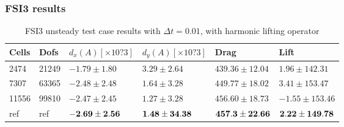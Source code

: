 \subsubsection*{FSI3 results}
\begin{table}[H]
\centering
\caption{FSI3 unsteady test case results with $\Delta t = 0.01$, with harmonic lifting operator}
\label{my-label}
\begin{tabular}{|l|l|l|l|l|l|}
\hline
Cells & Dofs & $d_x (A)[\times10?3 ]$ & $d_y (A)[\times10?3 ]$ & Drag & Lift \\ \hline
2474 & 21249 & $-1.79 \pm 1.80$ & $3.29 \pm 2.64$ & $439.36 \pm 12.04$ & $1.96 \pm 142.31$ \\ \hline
7307 & 63365 & $-2.48 \pm 2.48$ & $ 1.64 \pm 3.28$ & $449.77 \pm 18.02$ & $3.41 \pm 153.47$ \\ \hline
11556 & 99810 & $ -2.47 \pm 2.45$ & $ 1.27 \pm 3.28$ & $456.60 \pm 18.73$ & $-1.55 \pm 153.46$ \\ \hline
ref & ref & $\bold{-2.69 \pm  2.56}$ & $\bold{1.48 \pm 34.38}$ & $\bold{457.3 \pm 22.66}$ & $\bold{2.22 \pm 149.78}$ \\ \hline
\end{tabular}
\end{table}

